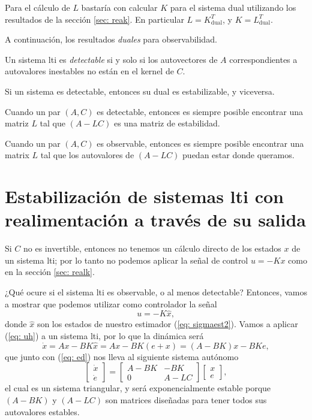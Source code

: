 Para el cálculo de $L$ bastaría con calcular $K$ para el sistema dual utilizando los resultados de la sección \ref{sec: reak}. En particular $L = K^T_{\text{dual}}$, y $K = L^T_{\text{dual}}$.

A continuación, los resultados \emph{duales} para observabilidad.
\begin{theorem}
	Un sistema lti es \emph{detectable} si y solo si los autovectores de $A$ correspondientes a autovalores inestables no están en el kernel de $C$.
\end{theorem}
Si un sistema es detectable, entonces su dual es estabilizable, y viceversa.
\begin{theorem}
	Cuando un par $(A,C)$ es detectable, entonces es siempre posible encontrar una matriz $L$ tal que $(A-LC)$ es una matriz de estabilidad.
\end{theorem}
\begin{theorem}
	Cuando un par $(A,C)$ es observable, entonces es siempre posible encontrar una matrix $L$ tal que los autovalores de $(A-LC)$ puedan estar donde queramos.
\end{theorem}

\section[Estabilización por realimentación de la salida]{Estabilización de sistemas lti con realimentación a través de su salida}

Si $C$ no es invertible, entonces no tenemos un cálculo directo de los estados $x$ de un sistema lti; por lo tanto no podemos aplicar la señal de control $u = -Kx$ como en la sección \ref{sec: realk}.

¿Qué ocure si el sistema lti es observable, o al menos detectable? Entonces, vamos a mostrar que podemos utilizar como controlador la señal
\begin{equation}
	u = -K \hat x, \label{eq: uh}
\end{equation}
donde $\hat x$ son los estados de nuestro estimador (\ref{eq: sigmaest2}). Vamos a aplicar (\ref{eq: uh}) a un sistema lti, por lo que la dinámica será
\begin{equation}
	\dot x = Ax - BK\hat x = Ax - BK(e + x) = (A -BK)x -BKe,
\end{equation}
que junto con (\ref{eq: ed}) nos lleva al siguiente sistema autónomo
\begin{equation}
	\begin{bmatrix}\dot x \\ \dot e\end{bmatrix} = \begin{bmatrix}A-BK & -BK \\ 0 & A-LC\end{bmatrix}\begin{bmatrix}x \\ e\end{bmatrix},
\end{equation}
el cual es un sistema triangular, y será exponencialmente estable porque $(A-BK)$ y $(A-LC)$ son matrices diseñadas para tener todos sus autovalores estables.

